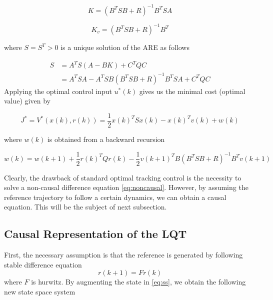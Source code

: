 \begin{equation}
K = (B^TSB + R)^{-1}B^TSA
\end{equation}

\begin{equation}
K_v = (B^TSB + R)^{-1}B^T
\end{equation}

where $S=S^T>0$ is a unique solution of the \ac {ARE} as follows

\begin{equation}
\begin{split}
S &= A^TS(A-BK) + C^TQC \\
&= A^TSA - A^TSB(B^TSB+R)^{-1}B^TSA + C^TQC
\end{split}
\end{equation}
Applying the optimal control input $u^*(k)$ gives us the minimal cost (optimal value) given by

\begin{equation}
J^* = V^*(x(k), r(k)) = \frac{1}{2}x(k)^TSx(k) - x(k)^Tv(k) + w(k)
\end{equation}

where $ w(k) $ is obtained from a backward recursion

\begin{equation}
w(k) = w(k+1) + \frac{1}{2}r(k)^TQr(k) - \frac{1}{2}v(k+1)^TB(B^TSB+R)^{-1}B^Tv(k+1)
\end{equation}

Clearly, the drawback of standard optimal tracking control is the necessity to solve a non-causal difference equation \eqref{eq:noncausal}. However, by assuming the reference trajectory to follow a certain dynamics, we can obtain a causal equation. This will be the subject of next subsection.

\subsection{Causal Representation of the LQT}
First, the necessary assumption is that the reference is generated by following stable difference equation
\begin{equation}
r(k+1) = Fr(k) 
\end{equation}
where $ F $ is hurwitz. By augmenting the state in \eqref{eq:ss}, we obtain the following new state space system

